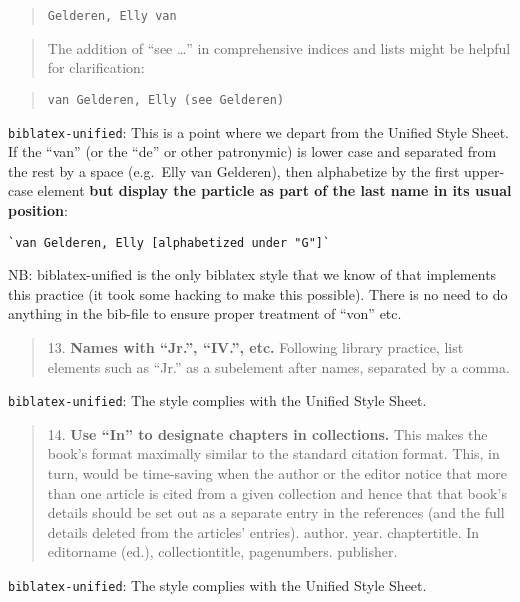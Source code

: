 \documentclass[
]{article}
\begin{document}
\begin{quote}
\texttt{Gelderen,\ Elly\ van}
\end{quote}

\begin{quote}
The addition of ``see \ldots{}'' in comprehensive indices and lists
might be helpful for clarification:
\end{quote}

\begin{quote}
\texttt{van\ Gelderen,\ Elly\ (see\ Gelderen)}
\end{quote}

\texttt{biblatex-unified}: This is a point where we depart from the
Unified Style Sheet. If the ``van'' (or the ``de'' or other patronymic)
is lower case and separated from the rest by a space (e.g.~Elly van
Gelderen), then alphabetize by the first upper-case element \textbf{but
display the particle as part of the last name in its usual position}:

\begin{verbatim}
`van Gelderen, Elly [alphabetized under "G"]`
\end{verbatim}

NB: biblatex-unified is the only biblatex style that we know of that
implements this practice (it took some hacking to make this possible).
There is no need to do anything in the bib-file to ensure proper
treatment of ``von'' etc.

\begin{quote}
13. \textbf{Names with ``Jr.'', ``IV.'', etc.} Following library
practice, list elements such as ``Jr.'' as a subelement after names,
separated by a comma.
\end{quote}

\texttt{biblatex-unified}: The style complies with the Unified Style
Sheet.

\begin{quote}
14. \textbf{Use ``In'' to designate chapters in collections.} This makes
the book's format maximally similar to the standard citation format.
This, in turn, would be time-saving when the author or the editor notice
that more than one article is cited from a given collection and hence
that that book's details should be set out as a separate entry in the
references (and the full details deleted from the articles' entries).
author. year. chaptertitle. In editorname (ed.), collectiontitle,
pagenumbers. publisher.
\end{quote}

\texttt{biblatex-unified}: The style complies with the Unified Style
Sheet.
\end{document}
